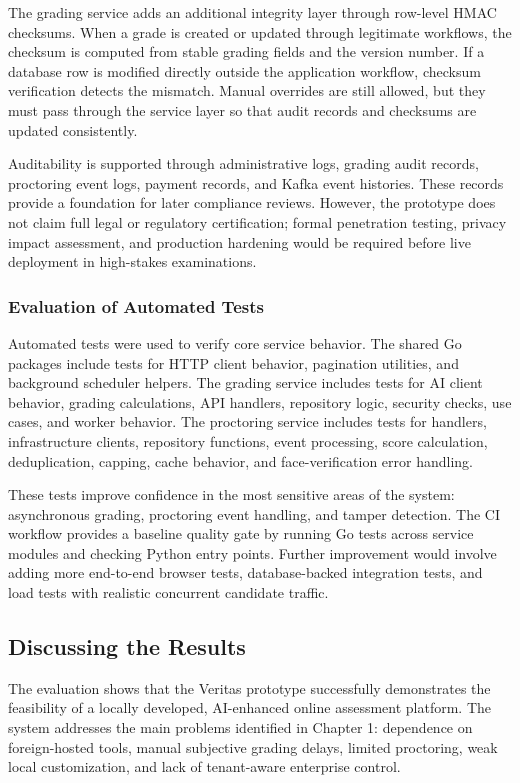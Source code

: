 The grading service adds an additional integrity layer through row-level HMAC checksums. When a grade is created or updated through legitimate workflows, the checksum is computed from stable grading fields and the version number. If a database row is modified directly outside the application workflow, checksum verification detects the mismatch. Manual overrides are still allowed, but they must pass through the service layer so that audit records and checksums are updated consistently.

Auditability is supported through administrative logs, grading audit records, proctoring event logs, payment records, and Kafka event histories. These records provide a foundation for later compliance reviews. However, the prototype does not claim full legal or regulatory certification; formal penetration testing, privacy impact assessment, and production hardening would be required before live deployment in high-stakes examinations.

\subsubsection{Evaluation of Automated Tests}
Automated tests were used to verify core service behavior. The shared Go packages include tests for HTTP client behavior, pagination utilities, and background scheduler helpers. The grading service includes tests for AI client behavior, grading calculations, API handlers, repository logic, security checks, use cases, and worker behavior. The proctoring service includes tests for handlers, infrastructure clients, repository functions, event processing, score calculation, deduplication, capping, cache behavior, and face-verification error handling.

These tests improve confidence in the most sensitive areas of the system: asynchronous grading, proctoring event handling, and tamper detection. The CI workflow provides a baseline quality gate by running Go tests across service modules and checking Python entry points. Further improvement would involve adding more end-to-end browser tests, database-backed integration tests, and load tests with realistic concurrent candidate traffic.

\subsection{Discussing the Results}
The evaluation shows that the Veritas prototype successfully demonstrates the feasibility of a locally developed, AI-enhanced online assessment platform. The system addresses the main problems identified in Chapter 1: dependence on foreign-hosted tools, manual subjective grading delays, limited proctoring, weak local customization, and lack of tenant-aware enterprise control.

